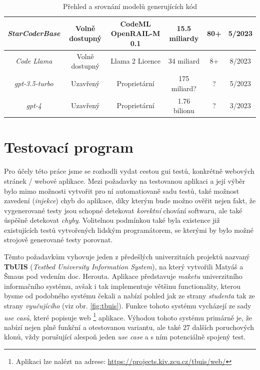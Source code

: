 \documentclass[czech, ma, kiv, he, iso690alph, pdf, viewonly]{fasthesis}
\begin{document}
\begin{landscape}
\begin{table}[H]
\begin{tabular}{|c|c|c|c|c|c|}
                    \hline
                    \textit{StarCoderBase} & Volně dostupný & CodeML OpenRAIL-M 0.1 & 15.5 miliardy & 80+ & 5/2023 \\
                    \hline
                    \textit{Code Llama} & Volně dostupný & Llama 2 Licence & 34 miliard & 8+ & 8/2023 \\
                    \hline
                    \textit{gpt-3.5-turbo} & Uzavřený & Proprietární & 175 miliard? & ? & 5/2023 \\
                    \hline
                    \textit{gpt-4} & Uzavřený & Proprietární & 1.76 bilionu & ? & 3/2023 \\
                    \hline
                \end{tabular}
                \centering
                \caption{Přehled a srovnání modelů generujících kód}
                \label{tab:code_models_comp}
            \end{table} 
        \end{landscape}
    
    \section{Testovací program} \label{sec:test_program}

    Pro účely této práce jsme se rozhodli vydat cestou \acrshort{gui} testů, konkrétně webových stránek / webové aplikace. Mezi požadavky na testovanou aplikaci a její výběr bylo mimo možnosti vytvořit pro ní automatiovaně sadu testů, také možnost zavedení (\emph{injekce}) chyb do aplikace, díky kterým bude možno ověřit nejen fakt, že vygenerované testy jsou schopné detekovat \textit{korektní} chování softwaru, ale také úspěšně detekovat \textit{chyby}. Volitelnou podmínkou také byla existence již existujících testů vytvořených lidským programátorem, se kterými by bylo možné strojově generované testy porovnat.
    
    Těmto požadavkům vyhovuje jeden z předešlých univerzitních projektů nazvaný \textbf{TbUIS} (\textit{Testbed University Information System}), na který vytvořili Matyáš a Šmaus pod vedením doc. Herouta. \cite{Matyas2018} \cite{Smaus2019} Aplikace představuje \textit{maketu} univerzitního informačního systému, avšak i tak implementuje většinu functionality, kterou bysme od podobného systému čekali a nabízí pohled jak ze strany \textit{studenta} tak ze strany \textit{vyučujícího} (viz obr. \ref{fig:tbuis}). Funkce tohoto systému vycházejí ze sady \textit{use casů}, které popisuje web \footnote{Aplikaci lze nalézt na adrese: \url{https://projects.kiv.zcu.cz/tbuis/web/}} aplikace. Výhodou tohoto systému primárně je, že nabízí nejen plně funkční a otestovanou variantu, ale také \(27\) dalších poruchových klonů, vždy porušující alespoň jeden \textit{use case} a s ním potenciálně spojený test.
\end{document}
